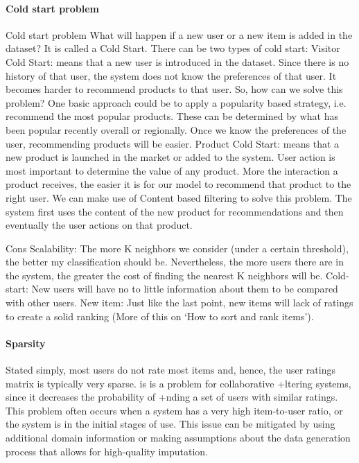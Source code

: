 \paragraph{Cold start problem}
Cold start problem
What will happen if a new user or a new item is added in the dataset? It is called a Cold Start. There can be two types of cold start:
	Visitor Cold Start: means that a new user is introduced in the dataset. Since there is no history of that user, the system does not 
know the preferences of that user. It becomes harder to recommend products to that user. So, how can we solve this problem? One basic
approach could be to apply a popularity based strategy, i.e. recommend the most popular products. These can be determined by what has
been popular recently overall or regionally. Once we know the preferences of the user, recommending products will be easier.
	Product Cold Start: means that a new product is launched in the market or added to the system. User action is most important to
determine the value of any product. More the interaction a product receives, the easier it is for our model to recommend that product
to the right user. We can make use of Content based filtering to solve this problem. The system first uses the content of the new 
product for recommendations and then eventually the user actions on that product.


  Cons
	Scalability: The more K neighbors we consider (under a certain threshold), the better my classification should be. 
  Nevertheless, the more users there are in the system, the greater the cost of finding the nearest K neighbors will be.
	Cold-start: New users will have no to little information about them to be compared with other users.
	New item: Just like the last point, new items will lack of ratings to create a solid ranking (More of this on ‘How to sort 
  and rank items’).

\paragraph{Sparsity}
Stated simply, most users do not rate most items and, hence, the user ratings matrix is typically very sparse. is is a problem for 
collaborative +ltering systems, since it decreases the probability of +nding a set of users with similar ratings. This problem often 
occurs when a system has a very high item-to-user ratio, or the system is in the initial stages of use. This issue can be mitigated by 
using additional domain information or making assumptions about the data generation process that allows for high-quality imputation.


